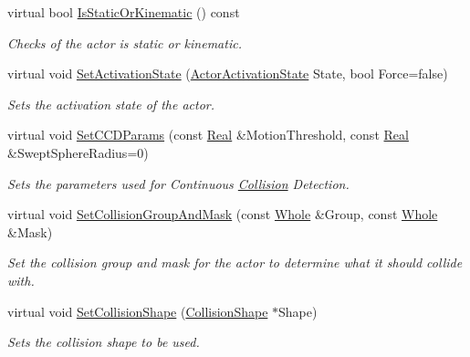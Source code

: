 \begin{DoxyCompactItemize}
virtual bool \hyperlink{classMezzanine_1_1ActorBasePhysicsSettings_ac3e3e2f779e0ff0e30abb719d6461e2e}{IsStaticOrKinematic} () const 
\begin{DoxyCompactList}\small\item\em Checks of the actor is static or kinematic. \item\end{DoxyCompactList}\item 
virtual void \hyperlink{classMezzanine_1_1ActorBasePhysicsSettings_aed2d1a5dd0ac0fa290242146ef9b8aa0}{SetActivationState} (\hyperlink{namespaceMezzanine_a752d573f0ccb7dac166a15a756dd0dbb}{ActorActivationState} State, bool Force=false)
\begin{DoxyCompactList}\small\item\em Sets the activation state of the actor. \item\end{DoxyCompactList}\item 
virtual void \hyperlink{classMezzanine_1_1ActorBasePhysicsSettings_a702a20cfb7d87dbc2a7d44ba9260ead2}{SetCCDParams} (const \hyperlink{namespaceMezzanine_a726731b1a7df72bf3583e4a97282c6f6}{Real} \&MotionThreshold, const \hyperlink{namespaceMezzanine_a726731b1a7df72bf3583e4a97282c6f6}{Real} \&SweptSphereRadius=0)
\begin{DoxyCompactList}\small\item\em Sets the parameters used for Continuous \hyperlink{classMezzanine_1_1Collision}{Collision} Detection. \item\end{DoxyCompactList}\item 
virtual void \hyperlink{classMezzanine_1_1ActorBasePhysicsSettings_a7755593c3c0f7bceecc6dfb6a7613000}{SetCollisionGroupAndMask} (const \hyperlink{namespaceMezzanine_adcbb6ce6d1eb4379d109e51171e2e493}{Whole} \&Group, const \hyperlink{namespaceMezzanine_adcbb6ce6d1eb4379d109e51171e2e493}{Whole} \&Mask)
\begin{DoxyCompactList}\small\item\em Set the collision group and mask for the actor to determine what it should collide with. \item\end{DoxyCompactList}\item 
virtual void \hyperlink{classMezzanine_1_1ActorBasePhysicsSettings_a9aa6c07c9cb235a417d68f1ea417f834}{SetCollisionShape} (\hyperlink{classMezzanine_1_1CollisionShape}{CollisionShape} $\ast$Shape)
\begin{DoxyCompactList}\small\item\em Sets the collision shape to be used. \item\end{DoxyCompactList}\item 

\end{DoxyCompactItemize}
